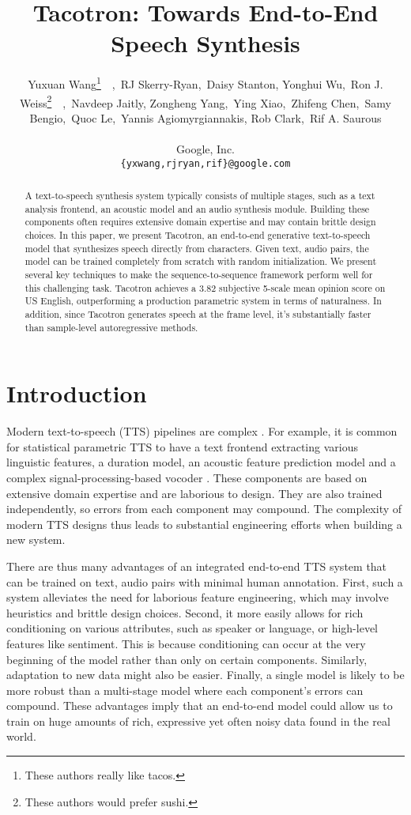 \documentclass{article} \usepackage{iclr2017_conference,times}
\title{Tacotron: Towards End-to-End Speech Synthesis}
\author{Yuxuan Wang\thanks{ These authors really like tacos.}~~,~RJ Skerry-Ryan,~Daisy Stanton, Yonghui Wu,~Ron J. Weiss\thanks{ These authors would prefer sushi.}~~,~Navdeep Jaitly, \And
Zongheng Yang,~Ying Xiao,~Zhifeng Chen,~Samy Bengio,~Quoc Le,~Yannis Agiomyrgiannakis,\And
Rob Clark,~Rif A. Saurous
\\
\\
Google, Inc.\\
\texttt{\{yxwang,rjryan,rif\}@google.com}
}
\begin{document}
\maketitle

\begin{abstract}
A text-to-speech synthesis system typically consists of multiple stages, such as a text analysis frontend, an acoustic model and an audio synthesis module. Building these components often requires extensive domain expertise and may contain brittle design choices. In this paper, we present Tacotron, an end-to-end generative text-to-speech model that synthesizes speech directly from characters. Given text, audio pairs, the model can be trained completely from scratch with random initialization. We present several key techniques to make the sequence-to-sequence framework perform well for this challenging task. Tacotron achieves a 3.82 subjective 5-scale mean opinion score on US English, outperforming a production parametric system in terms of naturalness. In addition, since Tacotron generates speech at the frame level, it's substantially faster than sample-level autoregressive methods.
\end{abstract}

\section{Introduction}
Modern text-to-speech (TTS) pipelines are complex \citep{taylor2009text}. For example, it is common for statistical parametric TTS to have a text frontend extracting various linguistic features, a duration model, an acoustic feature prediction model and a complex signal-processing-based vocoder \citep{zen2009statistical,agiomyrgiannakis2015vocaine}. These components are based on extensive domain expertise and are laborious to design. They are also trained independently, so errors from each component may compound. The complexity of modern TTS designs thus leads to substantial engineering efforts when building a new system.


There are thus many advantages of an integrated end-to-end TTS system that can be trained on text, audio pairs with minimal human annotation. First, such a system alleviates the need for laborious feature engineering, which may involve heuristics and brittle design choices. Second, it more easily allows for rich conditioning on various attributes, such as speaker or language, or high-level features like sentiment. This is because conditioning can occur at the very beginning of the model rather than only on certain components. Similarly, adaptation to new data might also be easier. Finally, a single model is likely to be more robust than a multi-stage model where each component's errors can compound. These advantages imply that an end-to-end model could allow us to train on huge amounts of rich, expressive yet often noisy data found in the real world.
\end{document}
